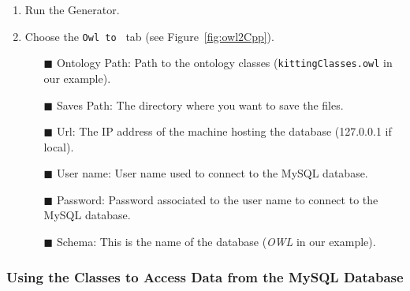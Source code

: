 \begin{enumerate}
  \item Run the Generator.
  \item Choose the \texttt{Owl to {\cpp}} tab (see Figure~\ref{fig:owl2Cpp}).
    \begin{itemize}
      \item[\textcolor{BrickRed}{$\blacksquare$}] Ontology Path: Path to the ontology classes (\texttt{kittingClasses.owl} in our example).
      \item[\textcolor{BrickRed}{$\blacksquare$}] Saves Path: The directory where you want to save the {\cpp} files.
      \item[\textcolor{BrickRed}{$\blacksquare$}] Url: The IP address of the machine hosting the database (127.0.0.1 if local).
      \item[\textcolor{BrickRed}{$\blacksquare$}] User name: User name used to connect to the MySQL database.
      \item[\textcolor{BrickRed}{$\blacksquare$}] Password: Password associated to the user name to connect to the MySQL database.
      \item[\textcolor{BrickRed}{$\blacksquare$}] Schema: This is the name of the database (\textit{OWL} in our example).
    \end{itemize}
\end{enumerate}

\subsubsection{Using the {\cpp} Classes to Access Data from the MySQL Database}

